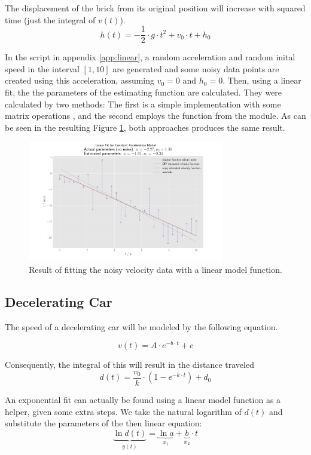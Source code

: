 \documentclass[10pt, a4paper]{article}
\begin{document}
The displacement of the brick from its original position will increase with squared time (just the integral of $v(t)$).
\[
  h(t) = -\frac{1}{2} \cdot g \cdot t^{2} + v_{0}\cdot t + h_{0}
\]

In the script in appendix \ref{app:linear}, a random acceleration and random inital speed in the interval $[1, 10]$ are generated and some noisy data points are created using this acceleration, assuming $v_{0} = 0$ and $h_{0} = 0$. Then, using a linear fit, the the parameters of the estimating function are calculated. They were calculated by two methods: The first is a simple implementation with some matrix operations \cite{mat_least_squares}, and the second employs the
 function from the  module. As can be seen in the resulting Figure \ref{fig:linear}, both approaches produces the same result.

\begin{figure}[h]
  \centering
  \includegraphics[width=0.764\textwidth]{graphics/linear_fit_1.pdf}
  \caption{Result of fitting the noisy velocity data with a linear model function.}\label{fig:linear}
\end{figure}


\subsection{Decelerating Car}
The speed of a decelerating car will be modeled by the following equation. \cite{stack_car}

\[
  v(t) = A \cdot e^{-b\cdot t} + c
\]

Consequently, the integral of this will result in the distance traveled
\[
  d(t) = \frac{v_{0}}{k}\cdot\left(1 - e^{-k\cdot t}\right) + d_{0}
\]

An exponential fit can actually be found using a linear model function as a helper, given some extra steps.
We take the natural logarithm of $d(t)$ and substitute the parameters of the then linear equation: \cite{brandt_data}
\[
  \underbrace{\ln{d(t)}}_{y(t)} = \underbrace{\ln{a}}_{x_{1}} + \underbrace{b}_{x_{2}} \cdot t
\]
\end{document}
